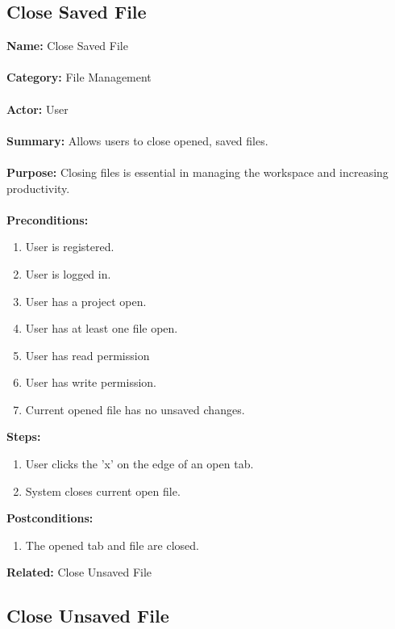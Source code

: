\documentclass[14pt, a4paper]{article}
\begin{document}
\newpage

\subsection{Close Saved File}

\begin{framed}
	\noindent\textbf{Name:} Close Saved File \\ \\
	\textbf{Category:} File Management \\ \\
	\textbf{Actor:} User \\ \\
	\textbf{Summary:} Allows users to close opened, saved files. \\ \\
	\textbf{Purpose:} Closing files is essential in managing the workspace and increasing productivity. \\ \\
	\textbf{Preconditions:} 
	\begin{enumerate}
		\item User is registered.
		\item User is logged in.
		\item User has a project open.
		\item User has at least one file open.
		\item User has read permission
		\item User has write permission.
		\item Current opened file has no unsaved changes.
	\end{enumerate}		
	\textbf{Steps:}
	\begin{enumerate}
		\item User clicks the 'x' on the edge of an open tab.
		\item System closes current open file.
	\end{enumerate}	
	\textbf{Postconditions:}
	\begin{enumerate}
		\item The opened tab and file are closed.
	\end{enumerate}
	\textbf{Related:} Close Unsaved File
\end{framed}

\newpage

\subsection{Close Unsaved File}
\end{document}
